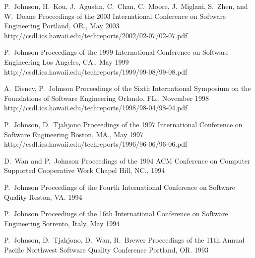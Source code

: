 \documentclass[11pt,letterpaper,sans]{moderncv} %
\begin{document}
          {P.~Johnson, H.~Kou, J.~Agustin, C.~Chan, C.~Moore, J.~Miglani, S.~Zhen, and W.~Doane}
          {Proceedings of the 2003 International Conference on Software Engineering}
          {Portland, OR., May 2003}
          {http://csdl.ics.hawaii.edu/techreports/2002/02-07/02-07.pdf}

          {P.~Johnson}
          {Proceedings of the 1999 International Conference on Software Engineering}
          {Los Angeles, CA., May 1999}
          {http://csdl.ics.hawaii.edu/techreports/1999/99-08/99-08.pdf}

          {A.~Disney, P.~Johnson}
          {Proceedings of the Sixth International Symposium on the Foundations of Software Engineering}
          {Orlando, FL., November 1998}
          {http://csdl.ics.hawaii.edu/techreports/1998/98-04/98-04.pdf}

          {P.~Johnson, D.~Tjahjono}
          {Proceedings of the 1997 International Conference on Software Engineering}
          {Boston, MA., May 1997}
          {http://csdl.ics.hawaii.edu/techreports/1996/96-06/96-06.pdf}

          {D.~Wan and P.~Johnson}
          {Proceedings of the 1994 ACM Conference on Computer Supported Cooperative Work}
          {Chapel Hill, NC., 1994}

          {P.~Johnson}
          {Proceedings of the Fourth International Conference on Software Quality}
          {Reston, VA. 1994}

          {P.~Johnson}
          {Proceedings of the 16th International Conference on Software Engineering}
          {Sorrento, Italy, May 1994}

          {P.~Johnson, D.~Tjahjono, D.~Wan, R.~Brewer}
          {Proceedings of the 11th Annual Pacific Northwest Software Quality Conference}
          {Portland, OR. 1993}
\end{document}
